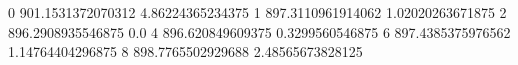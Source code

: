 0 901.1531372070312 4.86224365234375
1 897.3110961914062 1.02020263671875
2 896.2908935546875 0.0
4 896.620849609375 0.3299560546875
6 897.4385375976562 1.14764404296875
8 898.7765502929688 2.48565673828125
